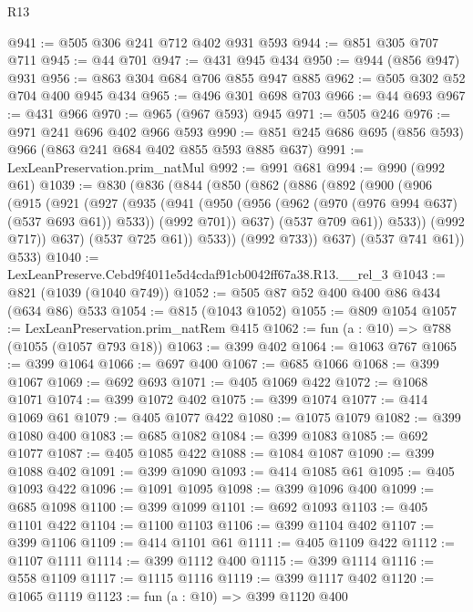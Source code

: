 \begin{lexlean}{R13}
\begin{coremodule}
@941 := @505 @306 @241 @712 @402 @931 @593
@944 := @851 @305 @707 @711
@945 := @44 @701
@947 := @431 @945 @434
@950 := @944 (@856 @947) @931
@956 := @863 @304 @684 @706 @855 @947 @885
@962 := @505 @302 @52 @704 @400 @945 @434
@965 := @496 @301 @698 @703
@966 := @44 @693
@967 := @431 @966
@970 := @965 (@967 @593) @945
@971 := @505 @246
@976 := @971 @241 @696 @402 @966 @593
@990 := @851 @245 @686 @695 (@856 @593) @966 (@863 @241 @684 @402 @855 @593 @885 @637)
@991 := LexLeanPreservation.prim_natMul
@992 := @991 @681
@994 := @990 (@992 @61)
@1039 := @830
    (@836
      (@844
        (@850
          (@862
            (@886
              (@892
                (@900
                  (@906
                    (@915
                      (@921
                        (@927
                          (@935
                            (@941
                              (@950
                                (@956 (@962 (@970 (@976 @994 @637) (@537 @693 @61)) @533))
                                (@992 @701))
                              @637)
                            (@537 @709 @61))
                          @533))
                      (@992 @717))
                    @637)
                  (@537 @725 @61))
                @533))
            (@992 @733))
          @637)
        (@537 @741 @61))
      @533)
@1040 := LexLeanPreserve.Cebd9f4011e5d4cdaf91cb0042ff67a38.R13.__rel_3
@1043 := @821 (@1039 (@1040 @749))
@1052 := @505 @87 @52 @400 @400 @86 @434 (@634 @86) @533
@1054 := @815 (@1043 @1052)
@1055 := @809 @1054
@1057 := LexLeanPreservation.prim_natRem @415
@1062 := fun (a : @10) => @788 (@1055 (@1057 @793 @18))
@1063 := @399 @402
@1064 := @1063 @767
@1065 := @399 @1064
@1066 := @697 @400
@1067 := @685 @1066
@1068 := @399 @1067
@1069 := @692 @693
@1071 := @405 @1069 @422
@1072 := @1068 @1071
@1074 := @399 @1072 @402
@1075 := @399 @1074
@1077 := @414 @1069 @61
@1079 := @405 @1077 @422
@1080 := @1075 @1079
@1082 := @399 @1080 @400
@1083 := @685 @1082
@1084 := @399 @1083
@1085 := @692 @1077
@1087 := @405 @1085 @422
@1088 := @1084 @1087
@1090 := @399 @1088 @402
@1091 := @399 @1090
@1093 := @414 @1085 @61
@1095 := @405 @1093 @422
@1096 := @1091 @1095
@1098 := @399 @1096 @400
@1099 := @685 @1098
@1100 := @399 @1099
@1101 := @692 @1093
@1103 := @405 @1101 @422
@1104 := @1100 @1103
@1106 := @399 @1104 @402
@1107 := @399 @1106
@1109 := @414 @1101 @61
@1111 := @405 @1109 @422
@1112 := @1107 @1111
@1114 := @399 @1112 @400
@1115 := @399 @1114
@1116 := @558 @1109
@1117 := @1115 @1116
@1119 := @399 @1117 @402
@1120 := @1065 @1119
@1123 := fun (a : @10) => @399 @1120 @400

\end{coremodule}
\end{lexlean}
